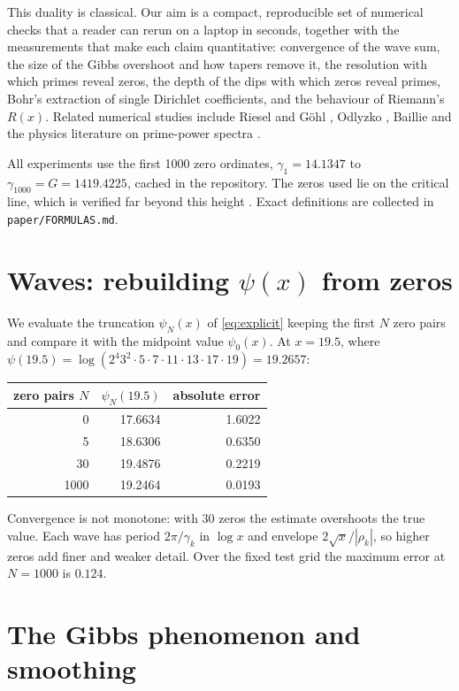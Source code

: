 \documentclass[11pt]{article}
\begin{document}
This duality is classical. Our aim is a compact, reproducible set of numerical checks that a reader can rerun on a laptop in seconds, together with the measurements that make each claim quantitative: convergence of the wave sum, the size of the Gibbs overshoot and how tapers remove it, the resolution with which primes reveal zeros, the depth of the dips with which zeros reveal primes, Bohr's extraction of single Dirichlet coefficients, and the behaviour of Riemann's $R(x)$. Related numerical studies include Riesel and G\"ohl \cite{rieselgohl1970}, Odlyzko \cite{odlyzko1987}, Baillie \cite{baillie2011} and the physics literature on prime-power spectra \cite{sakhr2003,main1998}.

All experiments use the first 1000 zero ordinates, $\gamma_1=14.1347$ to $\gamma_{1000}=G=1419.4225$, cached in the repository. The zeros used lie on the critical line, which is verified far beyond this height \cite{platttrudgian2021}. Exact definitions are collected in \texttt{paper/FORMULAS.md}.

\section{Waves: rebuilding $\psi(x)$ from zeros}

We evaluate the truncation $\psi_N(x)$ of \eqref{eq:explicit} keeping the first $N$ zero pairs and compare it with the midpoint value $\psi_0(x)$. At $x=19.5$, where $\psi(19.5)=\log(2^4 3^2\cdot5\cdot7\cdot11\cdot13\cdot17\cdot19)=19.2657$:

\begin{center}
\begin{tabular}{rrr}
\toprule
zero pairs $N$ & $\psi_N(19.5)$ & absolute error\\
\midrule
0 & 17.6634 & 1.6022\\
5 & 18.6306 & 0.6350\\
30 & 19.4876 & 0.2219\\
1000 & 19.2464 & 0.0193\\
\bottomrule
\end{tabular}
\end{center}

Convergence is not monotone: with 30 zeros the estimate overshoots the true value. Each wave has period $2\pi/\gamma_k$ in $\log x$ and envelope $2\sqrt{x}/|\rho_k|$, so higher zeros add finer and weaker detail. Over the fixed test grid the maximum error at $N=1000$ is $0.124$.

\section{The Gibbs phenomenon and smoothing}
\end{document}
